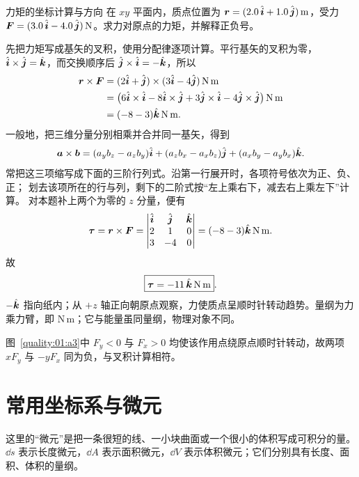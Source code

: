 \begin{origexamplebox}{力矩的坐标计算与方向}
在 $xy$ 平面内，质点位置为 $\bm{r}=(2.0\,\hat{\bm{i}}+1.0\,\hat{\bm{j}})\,\mathrm m$，受力
$\bm{F}=(3.0\,\hat{\bm{i}}-4.0\,\hat{\bm{j}})\,\mathrm N$。求力对原点的力矩，并解释正负号。

\end{origexamplebox}
\begin{xesolution}
先把力矩写成基矢的叉积，使用分配律逐项计算。平行基矢的叉积为零，
$\hat{\bm{i}}\times\hat{\bm{j}}=\hat{\bm{k}}$，而交换顺序后
$\hat{\bm{j}}\times\hat{\bm{i}}=-\hat{\bm{k}}$，所以
\begin{align*}
 \bm{r}\times\bm{F}
 &=(2\hat{\bm{i}}+\hat{\bm{j}})\times(3\hat{\bm{i}}-4\hat{\bm{j}})\,\mathrm{N\,m}\\
 &=\bigl(6\hat{\bm{i}}\times\hat{\bm{i}}-8\hat{\bm{i}}\times\hat{\bm{j}}
       +3\hat{\bm{j}}\times\hat{\bm{i}}-4\hat{\bm{j}}\times\hat{\bm{j}}\bigr)\,\mathrm{N\,m}\\
 &=(-8-3)\hat{\bm{k}}\,\mathrm{N\,m}.
\end{align*}
一般地，把三维分量分别相乘并合并同一基矢，得到
\[
 \bm{a}\times\bm{b}
 =(a_yb_z-a_zb_y)\hat{\bm{i}}+(a_zb_x-a_xb_z)\hat{\bm{j}}
 +(a_xb_y-a_yb_x)\hat{\bm{k}}.
\]
常把这三项缩写成下面的三阶行列式。沿第一行展开时，各项符号依次为正、负、正；
划去该项所在的行与列，剩下的二阶式按“左上乘右下，减去右上乘左下”计算。
对本题补上两个为零的 $z$ 分量，便有
\[
 \bm{\tau}=\bm{r}\times\bm{F}
 =\begin{vmatrix}
 \hat{\bm{i}}&\hat{\bm{j}}&\hat{\bm{k}}\\2&1&0\\3&-4&0
 \end{vmatrix}
 =(-8-3)\hat{\bm{k}}\,\mathrm{N\,m}.
\]
故
\[
 \boxed{\bm{\tau}=-11\,\hat{\bm{k}}\,\mathrm{N\,m}}.
\]
$-\hat{\bm{k}}$ 指向纸内；从 $+z$ 轴正向朝原点观察，力使质点呈顺时针转动趋势。量纲为力乘力臂，即 $\mathrm{N\,m}$；它与能量虽同量纲，物理对象不同。


图~\ref{quality:01:a3}中 $F_y<0$ 与 $F_x>0$ 均使该作用点绕原点顺时针转动，故两项 $xF_y$ 与 $-yF_x$ 同为负，与叉积计算相符。
\end{xesolution}

\section{常用坐标系与微元}

这里的“微元”是把一条很短的线、一小块曲面或一个很小的体积写成可积分的量。$\dd s$ 表示长度微元，$\dd A$ 表示面积微元，$\dd V$ 表示体积微元；它们分别具有长度、面积、体积的量纲。

